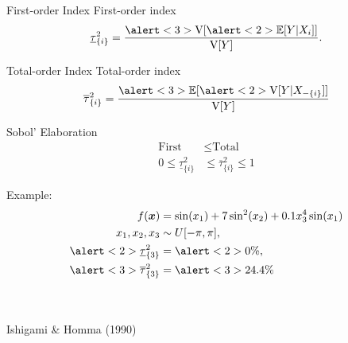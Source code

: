 \documentclass[14pt]{beamer}
\begin{document}
\begin{frame}{First-order Index}
   First-order index
  \begin{equation*}
    \underline{\tau}_{\{i\}}^2 = \frac{\alert<3>{\V[\alert<2>{\E[Y|X_i]}]}}{\V[Y]}.
  \end{equation*}

\end{frame}

\begin{frame}{Total-order Index}
  Total-order index
  \begin{equation*}
    \overline{\tau}_{\{i\}}^2 = \frac{\alert<3>{\E[\alert<2>{\V[Y|X_{-\{i\}}]}]}}{\V[Y]}
  \end{equation*}

\end{frame}

\begin{frame}{Sobol' Elaboration}
  \begin{equation*} \begin{aligned}
      \text{First} &\leq \text{Total} \\
      0 \leq \underline{\tau}_{\{i\}}^2 &\leq \overline{\tau}_{\{i\}}^2 \leq 1
  \end{aligned} \end{equation*}

  Example:
  \begin{equation*} \begin{aligned}
    f(\vx) &= \sin(x_1) + 7\sin^2(x_2) + 0.1 x_3^4\sin(x_1) \\
    x_1, x_2, x_3 &\sim U[-\pi, \pi], \\
    \alert<2>{\underline{\tau}_{\{3\}}^2} &= \alert<2>{0\%}, \\
    \alert<3>{\overline{\tau}_{\{3\}}^2} &= \alert<3>{24.4\%}
  \end{aligned} \end{equation*}

  \\
  \\
  \tiny Ishigami \& Homma (1990)
\end{frame}
\end{document}
